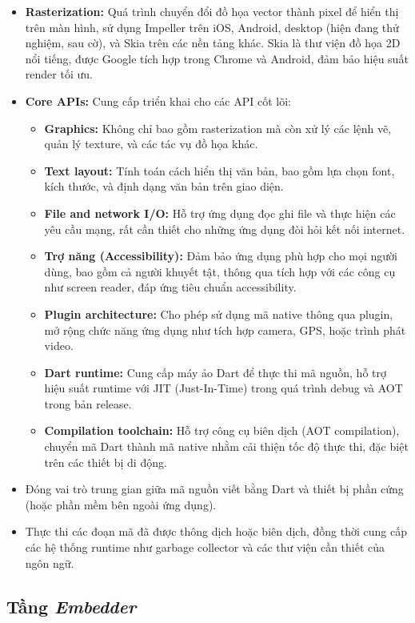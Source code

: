 \documentclass[../DoAn.tex]{subfiles}
\numberwithin{figure}{chapter}
\begin{document}
\begin{itemize}
    \item \textbf{Rasterization:} Quá trình chuyển đổi đồ họa vector thành pixel để hiển thị trên màn hình, sử dụng Impeller trên iOS, Android, desktop (hiện đang thử nghiệm, sau cờ), và Skia trên các nền tảng khác. Skia là thư viện đồ họa 2D nổi tiếng, được Google tích hợp trong Chrome và Android, đảm bảo hiệu suất render tối ưu.
    \item \textbf{Core APIs:} Cung cấp triển khai cho các API cốt lõi:
    \begin{itemize}
        \item \textbf{Graphics:} Không chỉ bao gồm rasterization mà còn xử lý các lệnh vẽ, quản lý texture, và các tác vụ đồ họa khác.
        \item \textbf{Text layout:} Tính toán cách hiển thị văn bản, bao gồm lựa chọn font, kích thước, và định dạng văn bản trên giao diện.
        \item \textbf{File and network I/O:} Hỗ trợ ứng dụng đọc ghi file và thực hiện các yêu cầu mạng, rất cần thiết cho những ứng dụng đòi hỏi kết nối internet.
        \item \textbf{Trợ năng (Accessibility):} Đảm bảo ứng dụng phù hợp cho mọi người dùng, bao gồm cả người khuyết tật, thông qua tích hợp với các công cụ như screen reader, đáp ứng tiêu chuẩn accessibility.
        \item \textbf{Plugin architecture:} Cho phép sử dụng mã native thông qua plugin, mở rộng chức năng ứng dụng như tích hợp camera, GPS, hoặc trình phát video.
        \item \textbf{Dart runtime:} Cung cấp máy ảo Dart để thực thi mã nguồn, hỗ trợ hiệu suất runtime với JIT (Just-In-Time) trong quá trình debug và AOT trong bản release.
        \item \textbf{Compilation toolchain:} Hỗ trợ công cụ biên dịch (AOT compilation), chuyển mã Dart thành mã native nhằm cải thiện tốc độ thực thi, đặc biệt trên các thiết bị di động.
    \end{itemize}
    \item Đóng vai trò trung gian giữa mã nguồn viết bằng Dart và thiết bị phần cứng (hoặc phần mềm bên ngoài ứng dụng).
    \item Thực thi các đoạn mã đã được thông dịch hoặc biên dịch, đồng thời cung cấp các hệ thống runtime như garbage collector và các thư viện cần thiết của ngôn ngữ.
\end{itemize}
\subsection{Tầng \textit{Embedder}}
\end{document}
